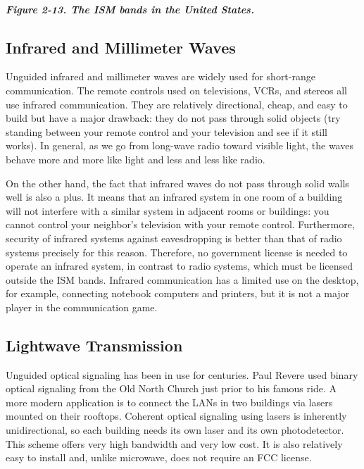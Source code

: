 \subparagraph[Figure 2-13. The ISM bands in the United
States.]{\texorpdfstring{\protect\hypertarget{0130661023_ch02lev1sec3.htmlux5cux23ch02fig13}{}{}Figure
2-13. The ISM bands in the United
States.}{Figure 2-13. The ISM bands in the United States.}}


\protect\hypertarget{0130661023_ch02lev1sec3.htmlux5cux23ch02lev2sec11}{}{}

\subsection{Infrared and Millimeter Waves}

Unguided infrared and millimeter waves are widely used for short-range
communication. The remote controls used on televisions, VCRs, and
stereos all use infrared communication. They are relatively directional,
cheap, and easy to build but have a major drawback: they do not pass
through solid objects (try standing between your remote control and your
television and see if it still works). In general, as we go from
long-wave radio toward visible light, the waves behave more and more
like light and less and less like radio.

On the other hand, the fact that infrared waves do not pass through
solid walls well is also a plus. It means that an infrared system in one
room of a building will not interfere with a similar system in adjacent
rooms or buildings: you cannot control your neighbor's television with
your remote control. Furthermore, security of infrared systems against
eavesdropping is better than that of radio systems precisely for this
reason. Therefore, no government license is needed to operate an
infrared system, in contrast to radio systems, which must be licensed
outside the ISM bands. Infrared communication has a limited use on the
desktop, for example, connecting notebook computers and printers, but it
is not a major player in the communication game.

\protect\hypertarget{0130661023_ch02lev1sec3.htmlux5cux23ch02lev2sec12}{}{}

\subsection{Lightwave Transmission}

Unguided optical signaling has been in use for centuries. Paul Revere
used binary optical signaling from the Old North Church just prior to
his famous ride. A more modern application is to connect the LANs in two
buildings via lasers mounted on their rooftops. Coherent optical
signaling using lasers is inherently unidirectional, so each building
needs its own laser and its own photodetector. This scheme offers very
high bandwidth and very low cost. It is also relatively easy to install
and, unlike microwave, does not require an FCC license.


